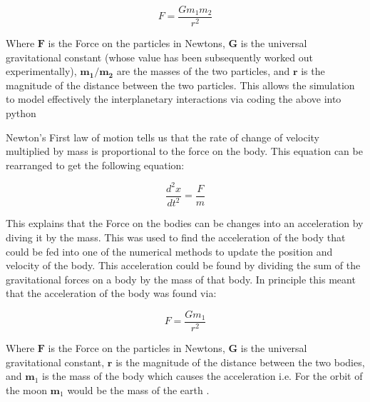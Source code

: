 \documentclass[a4paper,10pt]{article}
\begin{document}
\begin{equation}
  F = \frac{Gm_{1}m_{2}}{r^{2}} \label{eq:Gravitational Force}
\end{equation}

Where $\boldsymbol F$ is the Force on the particles in Newtons, $\boldsymbol G$ is the universal gravitational constant (whose value has been subsequently worked out experimentally), $\boldsymbol {m_{1} /  m_{2}}$ are the masses of the two particles, and $\boldsymbol r$ is the magnitude of the distance between the two particles. This allows the simulation to model effectively the interplanetary interactions via coding the above into python

Newton's First law of motion tells us that the rate of change of velocity multiplied by mass is proportional to the force on the body. This equation can be rearranged to get the following equation:

\begin{equation}
  \frac{d^{2}x}{dt^{2}} = \frac{F}{m} \label{eq:Newton's First Law of Motion}
\end{equation}

This explains that the Force on the bodies can be changes into an acceleration by diving it by the mass. This was used to find the acceleration of the body that could be fed into one of the numerical methods to update the position and velocity of the body. This acceleration could be found by dividing the sum of the gravitational forces on a body by the mass of that body. In principle this meant that the acceleration of the body was found via:

\begin{equation}
F = \frac{Gm_{1}}{r^{2}} \label{eq:Gravitational Acceleration}
\end{equation}

Where $\boldsymbol F$ is the Force on the particles in Newtons, $\boldsymbol G$ is the universal gravitational constant, $\boldsymbol r$ is the magnitude of the distance between the two bodies, and $\boldsymbol m_1$ is the mass of the body which causes the acceleration i.e. For the orbit of the moon $\boldsymbol m_1$ would be the mass of the earth \cite{The earth moon system}.
\end{document}
